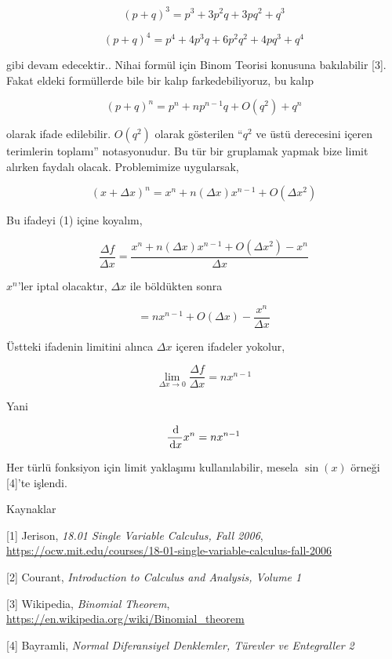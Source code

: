 \documentclass[12pt,fleqn]{article}\usepackage{../../common}
\begin{document}
$$
(p+q)^3 = p^3 + 3 p^2 q + 3pq^2 + q^3
$$

$$
(p+q)^4 = p^4 + 4p^3 q + 6p^2 q^2 + 4p q^3 + q^4
$$

gibi devam edecektir.. Nihai formül için Binom Teorisi konusuna bakılabilir [3].
Fakat eldeki formüllerde bile bir kalıp farkedebiliyoruz, bu kalıp

$$
(p+q)^n = p^n + n p^{n-1} q + O(q^2) + q^n
$$

olarak ifade edilebilir. $O(q^2)$ olarak gösterilen ``$q^2$ ve üstü derecesini
içeren terimlerin toplamı'' notasyonudur. Bu tür bir gruplamak yapmak bize limit
alırken faydalı olacak. Problemimize uygularsak,

$$
(x+\Delta x)^n = x^n + n (\Delta x)x^{n-1} + O(\Delta x^2)
$$

Bu ifadeyi (1) içine koyalım,

$$
\frac{\Delta f}{\Delta x} =
\frac{x^n + n (\Delta x)x^{n-1} + O(\Delta x^2) - x^n}{\Delta x}
$$

$x^n$'ler iptal olacaktır, $\Delta x$ ile böldükten sonra

$$
= n x^{n-1} + O(\Delta x) - \frac{x^n}{\Delta x}
$$

Üstteki ifadenin limitini alınca $\Delta x$ içeren ifadeler yokolur,

$$
\lim_{\Delta x \to 0} \frac{\Delta f}{\Delta x} =
n x^{n-1}
$$

Yani

$$
\frac{\,\mathrm{d} }{\,\mathrm{d} x} x^n = n x^{n-1}
$$

Her türlü fonksiyon için limit yaklaşımı kullanılabilir, mesela $\sin(x)$ örneği
[4]'te işlendi.

Kaynaklar

[1] Jerison, {\em 18.01 Single Variable Calculus, Fall 2006},
    \url{https://ocw.mit.edu/courses/18-01-single-variable-calculus-fall-2006}

[2] Courant, {\em Introduction to Calculus and Analysis, Volume 1}

[3] Wikipedia, {\em Binomial Theorem},
    \url{https://en.wikipedia.org/wiki/Binomial_theorem}

[4] Bayramli, {\em Normal Diferansiyel Denklemler, Türevler ve Entegraller 2}
    
\end{document}
